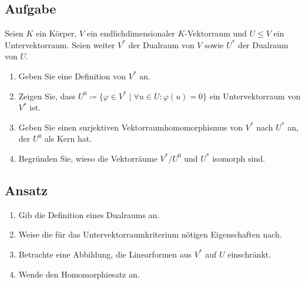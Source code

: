 \subsection{Aufgabe}
Seien \( K \) ein Körper, \( V \) ein endlichdimensionaler \( K \)-Vektorraum und \( U \leq V \) ein Untervektorraum. Seien weiter \( V^\ast \) der Dualraum von \( V \) sowie \( U^\ast \) der Dualraum von \( U \).
\begin{enumerate}
	\item Geben Sie eine Definition von \( V^\ast \) an.
	\item Zeigen Sie, dass \( U^0 \coloneqq \{ \varphi \in V^\ast \mid \forall u \in U: \varphi(u) = 0 \} \) ein Untervektorraum von \( V^\ast \) ist.
	\item Geben Sie einen surjektiven Vektorraumhomomorphismus von \( V^\ast \) nach \( U^\ast \) an, der \( U^0 \) als Kern hat.
	\item Begründen Sie, wieso die Vektorräume \( V^\ast/U^0 \) und \( U^\ast \) isomorph sind. 
\end{enumerate}

\subsection{Ansatz}
\begin{enumerate}
	\item Gib die Definition eines Dualraums an.
	\item Weise die für das Untervektorraumkriterium nötigen Eigenschaften nach.
	\item Betrachte eine Abbildung, die Linearformen aus \( V^\ast \) auf \( U \) einschränkt.
	\item Wende den Homomorphiesatz an. 
\end{enumerate}

